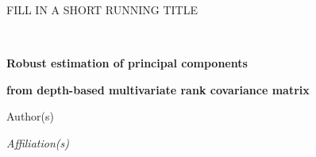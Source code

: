 \documentclass[10pt]{book}
\begin{document}
\newtheorem{Theorem}{Theorem}[section]
\newtheorem{Lemma}[Theorem]{Lemma}
\newtheorem{Corollary}[Theorem]{Corollary}
\theoremstyle{definition} \newtheorem{Definition}[Theorem]{Definition}
\newtheorem{example}{Example}
\newtheorem{remark}{Remark}




{\hfill {\footnotesize\rm FILL IN A SHORT RUNNING TITLE} \hfill}

\renewcommand{\thefootnote}{}
$\ $\par


\fontsize{10.95}{14pt plus.8pt minus .6pt}\selectfont
\vspace{0.8pc}
\centerline{\large\bf Robust estimation of principal components}
\vspace{2pt}
\centerline{\large\bf from depth-based multivariate rank covariance matrix}
\vspace{.4cm}
\centerline{Author(s)}
\vspace{.4cm}
\centerline{\it Affiliation(s)}
\vspace{.55cm}
\fontsize{9}{11.5pt plus.8pt minus .6pt}\selectfont

\end{document}

